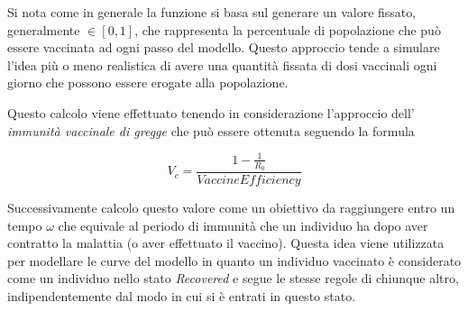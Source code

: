 Si nota come in generale la funzione si basa sul generare un valore fissato, 
generalmente $\in [0,1]$, che rappresenta la percentuale di popolazione che può 
essere vaccinata ad ogni passo del modello. Questo approccio tende a simulare l'idea 
più o meno realistica di avere una quantità fissata di dosi vaccinali 
ogni giorno che possono essere erogate alla popolazione. 

Questo calcolo viene effettuato tenendo in considerazione l'approccio 
dell' \emph{immunità vaccinale di gregge} 
che può essere ottenuta seguendo la formula 

$$V_c = \frac{1-\frac{1}{R_0}}{VaccineEfficiency}$$

Successivamente calcolo questo valore come un obiettivo da raggiungere entro un tempo $\omega$ 
che equivale al periodo di immunità che un individuo ha dopo aver contratto la malattia 
(o aver effettuato il vaccino). Questa idea viene utilizzata per modellare le curve del 
modello in quanto un individuo vaccinato è considerato come un individuo nello stato 
\emph{Recovered} e segue le stesse regole di chiunque altro, indipendentemente
dal modo in cui si è entrati in questo stato. 

